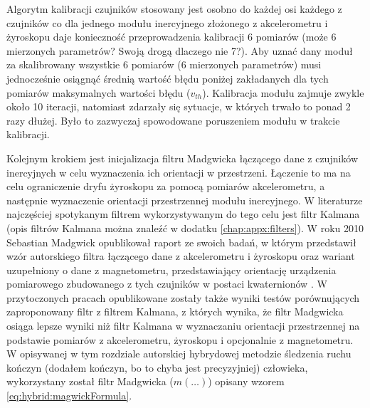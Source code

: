 Algorytm kalibracji czujników stosowany jest osobno do każdej osi każdego z czujników co dla jednego modułu inercyjnego złożonego z akcelerometru i żyroskopu daje konieczność przeprowadzenia kalibracji 6 pomiarów (może 6 mierzonych parametrów? Swoją drogą dlaczego nie 7?). Aby uznać dany moduł za skalibrowany wszystkie 6 pomiarów (6 mierzonych parametrów) musi jednocześnie osiągnąć średnią wartość błędu poniżej zakładanych dla tych pomiarów maksymalnych wartości błędu ($v_{th}$). Kalibracja modułu zajmuje zwykle około 10 iteracji, natomiast zdarzały się sytuacje, w których trwało to ponad 2 razy dłużej. Było to zazwyczaj spowodowane poruszeniem modułu w trakcie kalibracji.

Kolejnym krokiem jest inicjalizacja filtru Madgwicka łączącego dane z czujników inercyjnych w celu wyznaczenia ich orientacji w przestrzeni. Łączenie to ma na celu ograniczenie dryfu żyroskopu za pomocą pomiarów akcelerometru, a następnie wyznaczenie orientacji przestrzennej modułu inercyjnego. W literaturze najczęściej spotykanym filtrem wykorzystywanym do tego celu jest filtr Kalmana \cite{Sasiadek2000, Sabatini2011, Mau2005, Qingming2014} (opis filtrów Kalmana można znaleźć w dodatku \ref{chap:appx:filters}). W roku 2010 Sebastian Madgwick opublikował raport ze swoich badań, w którym przedstawił wzór autorskiego filtra łączącego dane z akcelerometru i żyroskopu oraz wariant uzupełniony o dane z magnetometru,  przedstawiający orientację urządzenia pomiarowego zbudowanego z tych czujników w postaci kwaternionów \cite{Madgwick2010, Madgwick2011}. W przytoczonych pracach opublikowane zostały także wyniki testów porównujących zaproponowany filtr z filtrem Kalmana, z których wynika, że filtr Madgwicka osiąga lepsze wyniki niż filtr Kalmana w wyznaczaniu orientacji przestrzennej na podstawie pomiarów z akcelerometru, żyroskopu i opcjonalnie z magnetometru. W opisywanej w tym rozdziale autorskiej hybrydowej metodzie śledzenia ruchu kończyn (dodałem kończyn, bo to chyba jest precyzyjniej) człowieka, wykorzystany został filtr Madgwicka ($m(\ldots)$) opisany wzorem \eqref{eq:hybrid:magwickFormula}. 

